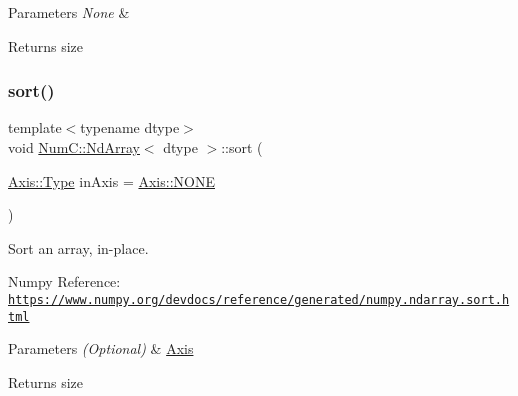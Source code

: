 \begin{DoxyParams}{Parameters}
{\em None} & \\
\hline
\end{DoxyParams}
\begin{DoxyReturn}{Returns}
size 
\end{DoxyReturn}
\mbox{\label{class_num_c_1_1_nd_array_aae7e14bb192456a85f253bc359625042}} 
\subsubsection{\texorpdfstring{sort()}{sort()}}
{\footnotesize\ttfamily template$<$typename dtype$>$ \\
void \mbox{\hyperlink{class_num_c_1_1_nd_array}{Num\+C\+::\+Nd\+Array}}$<$ dtype $>$\+::sort (\begin{DoxyParamCaption}\item[{\mbox{\hyperlink{struct_num_c_1_1_axis_a8e689044ef1941a03482e730c5e7ebb3}{Axis\+::\+Type}}}]{in\+Axis = {\ttfamily \mbox{\hyperlink{struct_num_c_1_1_axis_a8e689044ef1941a03482e730c5e7ebb3a0ae033c4226f7184bf0050b101e7ed94}{Axis\+::\+N\+O\+NE}}} }\end{DoxyParamCaption})\hspace{0.3cm}{\ttfamily [inline]}}

Sort an array, in-\/place.

Numpy Reference\+: \href{https://www.numpy.org/devdocs/reference/generated/numpy.ndarray.sort.html}{\tt https\+://www.\+numpy.\+org/devdocs/reference/generated/numpy.\+ndarray.\+sort.\+html}


\begin{DoxyParams}{Parameters}
{\em (\+Optional)} & \mbox{\hyperlink{struct_num_c_1_1_axis}{Axis}} \\
\hline
\end{DoxyParams}
\begin{DoxyReturn}{Returns}
size 
\end{DoxyReturn}
\mbox{\label{class_num_c_1_1_nd_array_a2f7450b2a02a7399a9fa69cbd5fa8005}} 
